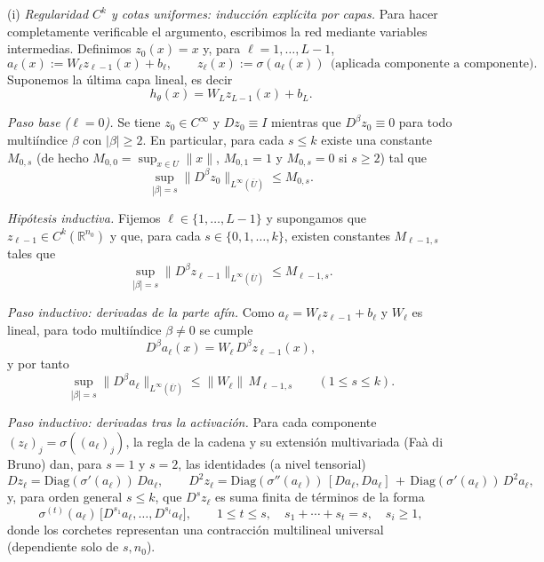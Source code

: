 (i) \emph{Regularidad $C^k$ y cotas uniformes: inducción explícita por capas.}
Para hacer completamente verificable el argumento, escribimos la red mediante variables intermedias.
Definimos $z_0(x)=x$ y, para $\ell=1,\dots,L-1$,
\[
a_\ell(x):=W_\ell z_{\ell-1}(x)+b_\ell,\qquad
z_\ell(x):=\sigma(a_\ell(x))\ \ \text{(aplicada componente a componente)}.
\]
Suponemos la última capa lineal, es decir
\[
h_\theta(x)=W_L z_{L-1}(x)+b_L.
\]

\smallskip
\noindent\textit{Paso base ($\ell=0$).}
Se tiene $z_0\in C^\infty$ y
$Dz_0\equiv I$ mientras que $D^\beta z_0\equiv 0$ para todo multiíndice $\beta$ con $|\beta|\ge 2$.
En particular, para cada $s\le k$ existe una constante $M_{0,s}$ (de hecho $M_{0,0}=\sup_{x\in U}\|x\|$, $M_{0,1}=1$ y $M_{0,s}=0$ si
$s\ge 2$) tal que
\[
\sup_{|\beta|=s}\|D^\beta z_0\|_{L^\infty(\overline U)}\le M_{0,s}.
\]

\smallskip
\noindent\textit{Hipótesis inductiva.}
Fijemos $\ell\in\{1,\dots,L-1\}$ y supongamos que $z_{\ell-1}\in C^k(\mathbb{R}^{n_0})$ y que, para cada
$s\in\{0,1,\dots,k\}$, existen constantes $M_{\ell-1,s}$ tales que
\begin{equation}\label{eq:lemma1_ind_hyp}
\sup_{|\beta|=s}\|D^\beta z_{\ell-1}\|_{L^\infty(\overline U)}\le M_{\ell-1,s}.
\end{equation}

\smallskip
\noindent\textit{Paso inductivo: derivadas de la parte afín.}
Como $a_\ell=W_\ell z_{\ell-1}+b_\ell$ y $W_\ell$ es lineal, para todo multiíndice $\beta\neq 0$ se cumple
\[
D^\beta a_\ell(x)=W_\ell\,D^\beta z_{\ell-1}(x),
\]
y por tanto
\begin{equation}\label{eq:lemma1_affine_bound}
\sup_{|\beta|=s}\|D^\beta a_\ell\|_{L^\infty(\overline U)}\le \|W_\ell\|\,M_{\ell-1,s}\qquad (1\le s\le k).
\end{equation}

\smallskip
\noindent\textit{Paso inductivo: derivadas tras la activación.}
Para cada componente $(z_\ell)_j=\sigma((a_\ell)_j)$, la regla de la cadena y su extensión multivariada
(Faà di Bruno) dan, para $s=1$ y $s=2$, las identidades (a nivel tensorial)
\[
D z_\ell=\mathrm{Diag}(\sigma'(a_\ell))\,D a_\ell,
\qquad
D^2 z_\ell=\mathrm{Diag}(\sigma''(a_\ell))\,[Da_\ell,Da_\ell]
\,+\,\mathrm{Diag}(\sigma'(a_\ell))\,D^2 a_\ell,
\]
y, para orden general $s\le k$, que $D^s z_\ell$ es suma finita de términos de la forma
\begin{equation}\label{eq:lemma1_fdb_form}
\sigma^{(t)}(a_\ell)\,\big[ D^{s_1}a_\ell,\dots,D^{s_t}a_\ell\big],
\qquad
1\le t\le s,\quad s_1+\cdots+s_t=s,\quad s_i\ge 1,
\end{equation}
donde los corchetes representan una contracción multilineal universal (dependiente solo de $s,n_0$).

